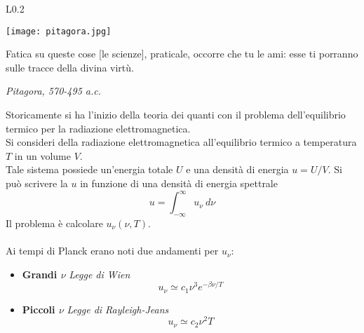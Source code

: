 \documentclass[twoside]{article}
\begin{document}
\begin{wrapfigure}[4]{L}{0.2\textwidth}
  \begin{center}
    \texttt{[image: pitagora.jpg]}
  \end{center}
\end{wrapfigure}\leavevmode

\vspace{8mm}

\epigraph{Fatica su queste cose [le scienze], praticale, occorre che tu le ami: esse ti porranno sulle tracce della divina virtù.}{\textit{Pitagora, 570-495 a.c.}}
\vspace{8mm}

Storicamente si ha l'inizio della teoria dei quanti con il problema dell'equilibrio termico per la radiazione elettromagnetica.
\\
Si consideri della radiazione elettromagnetica all'equilibrio termico a temperatura $T$ in un volume $V$.
\\
Tale sistema possiede un'energia totale $U$ e una densità di energia $u=U/V$.
Si può scrivere la $u$ in funzione di una densità di energia spettrale
\begin{equation}
    u=\int_{-\infty} ^{\infty}u_{\nu} \ d\nu
\end{equation}
Il problema è calcolare $u_{\nu}(\nu,T)$.
\\
\\
Ai tempi di Planck erano noti due andamenti per $u_{\nu}$:
\begin{itemize}
    \item \textbf{Grandi $\nu$} \textit{Legge di Wien}
    \begin{equation}
        u_{\nu}\simeq c_1 \nu^3 e^{-\beta \nu /T}
    \end{equation}
    \item \textbf{Piccoli $\nu$} \textit{Legge di Rayleigh-Jeans}
    \begin{equation}
        u_{\nu}\simeq c_2 \nu^2 T
    \end{equation}
\end{itemize}

\vspace{0.5cm}
\end{document}
